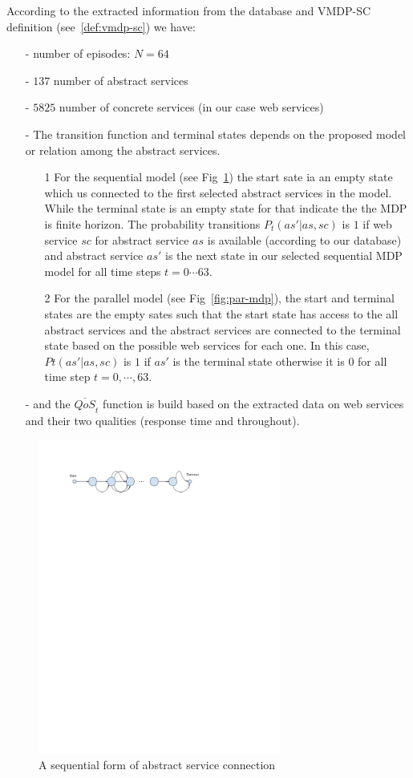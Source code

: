 \documentclass[10pt,journal,compsoc]{IEEEtran}
\begin{document}
According to the extracted information from the database and VMDP-SC definition (see~\ref{def:vmdp-sc}) we have:
\begin{itemize}
\item[-] number of episodes:  $N=64$
\item[-] $137$ number of abstract services 
\item[-] $5825$ number of concrete services (in our case web services)
\item[-]  The transition function and terminal states depends on the proposed model or relation among the abstract services. 
\begin{itemize}
\item[1] For the sequential model (see Fig~\ref{fig:seq-mdp}) the start sate ia an empty state which us connected to the first selected abstract services in the model.  While the terminal state is an empty state for that indicate the the MDP is finite horizon. The probability transitions $P_t(as' | as, sc)$ is $1$ if web service $sc$ for abstract service $as$ is available (according to our database) and abstract service $as'$ is the next state in our selected sequential MDP model for all time steps $t=0 \cdots 63$. 
\item[2] For the parallel model (see Fig~\ref{fig:par-mdp}), the start and terminal states are the empty sates such that the start state has access to the all abstract services and the abstract services are connected to the terminal state based on the possible web services for each one. In this case, $Pt(as'|as, sc)$ is $1$ if $as'$ is the terminal state otherwise it is $0$ for all time step $t = 0, \cdots, 63$. 
\end{itemize}
\item[-] and the $\overline{QoS}_t$ function is build based on the extracted data on web services and their two qualities (response time and throughout).
\end{itemize}

\begin{figure}[t]
\label{fig:seq-mdp}
\includegraphics[width=8cm]{graphs/seq-mdp}
\caption{A sequential form of abstract service connection}
\centering
\end{figure}
\end{document}
